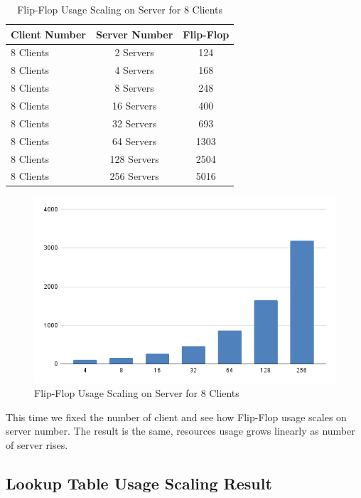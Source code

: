 \begin{table}[htb]
	\centering
	\caption{Flip-Flop Usage Scaling on Server for 8 Clients}
	\begin{tabular}{l c c}
		\toprule
    	Client Number  & Server Number  & Flip-Flop\\ \midrule
        8	Clients	&	2	Servers	&	124	\\
        8	Clients	&	4	Servers	&	168	\\
        8	Clients	&	8	Servers	&	248	\\
        8	Clients	&	16	Servers	&	400	\\
        8	Clients	&	32	Servers	&	693	\\
        8	Clients	&	64	Servers	&	1303	\\
        8	Clients	&	128	Servers	&	2504	\\
        8	Clients	&	256	Servers	&	5016	\\
		\bottomrule
	\end{tabular}
	\label{tab:ffc8}
\end{table}

\begin{figure}[h]
	\centering
	\includegraphics[width=.9\linewidth]{figures/Scaling/FF-8Client.png}
	\caption{Flip-Flop Usage Scaling on Server for 8 Clients}
	\label{fig:ffc8}
\end{figure}

This time we fixed the number of client and see how Flip-Flop usage scales on server number. The result is the same, resources usage grows linearly as number of server rises.

\newpage
\subsection{Lookup Table Usage Scaling Result}

